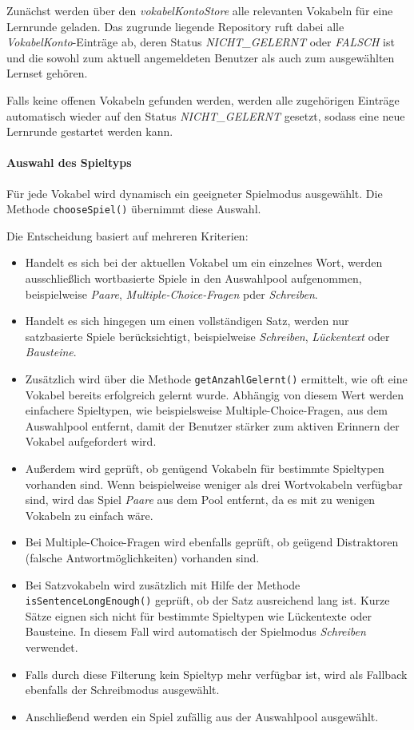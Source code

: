 Zunächst werden über den \textit{vokabelKontoStore} alle relevanten Vokabeln für eine Lernrunde geladen.
Das zugrunde liegende Repository ruft dabei alle \textit{VokabelKonto}-Einträge ab, deren Status \textit{NICHT\_GELERNT} oder \textit{FALSCH} ist
und die sowohl zum aktuell angemeldeten Benutzer als auch zum ausgewählten Lernset gehören.

Falls keine offenen Vokabeln gefunden werden, werden alle zugehörigen Einträge automatisch wieder auf den Status \textit{NICHT\_GELERNT} gesetzt,
sodass eine neue Lernrunde gestartet werden kann.

\paragraph{Auswahl des Spieltyps}

Für jede Vokabel wird dynamisch ein geeigneter Spielmodus ausgewählt.
Die Methode \texttt{chooseSpiel()} übernimmt diese Auswahl.

Die Entscheidung basiert auf mehreren Kriterien:
\begin{itemize}
    \item Handelt es sich bei der aktuellen Vokabel um ein einzelnes Wort, werden ausschließlich wortbasierte Spiele in den Auswahlpool aufgenommen, 
    beispielweise \textit{Paare}, \textit{Multiple-Choice-Fragen} pder \textit{Schreiben}.
    \item Handelt es sich hingegen um einen vollständigen Satz, werden nur satzbasierte Spiele berücksichtigt, 
    beispielweise \textit{Schreiben}, \textit{Lückentext} oder \textit{Bausteine}.
    \item Zusätzlich wird über die Methode \texttt{getAnzahlGelernt()} ermittelt, wie oft eine Vokabel bereits erfolgreich gelernt wurde.
    Abhängig von diesem Wert werden einfachere Spieltypen, wie beispielsweise Multiple-Choice-Fragen, aus dem Auswahlpool entfernt, damit der Benutzer stärker
    zum aktiven Erinnern der Vokabel aufgefordert wird.
    \item Außerdem wird geprüft, ob genügend Vokabeln für bestimmte Spieltypen vorhanden sind.
    Wenn beispielweise weniger als drei Wortvokabeln verfügbar sind, wird das Spiel \textit{Paare} aus dem Pool entfernt, da es mit zu wenigen Vokabeln zu einfach wäre.
    \item Bei Multiple-Choice-Fragen wird ebenfalls geprüft, ob geügend Distraktoren (falsche Antwortmöglichkeiten) vorhanden sind.
    \item Bei Satzvokabeln wird zusätzlich mit Hilfe der Methode \texttt{isSentenceLongEnough()} geprüft, ob der Satz ausreichend lang ist.
    Kurze Sätze eignen sich nicht für bestimmte Spieltypen wie Lückentexte oder Bausteine.
    In diesem Fall wird automatisch der Spielmodus \textit{Schreiben} verwendet.
    \item Falls durch diese Filterung kein Spieltyp mehr verfügbar ist, wird als Fallback ebenfalls der Schreibmodus ausgewählt.
    \item Anschließend werden ein Spiel zufällig aus der Auswahlpool ausgewählt.
\end{itemize}


